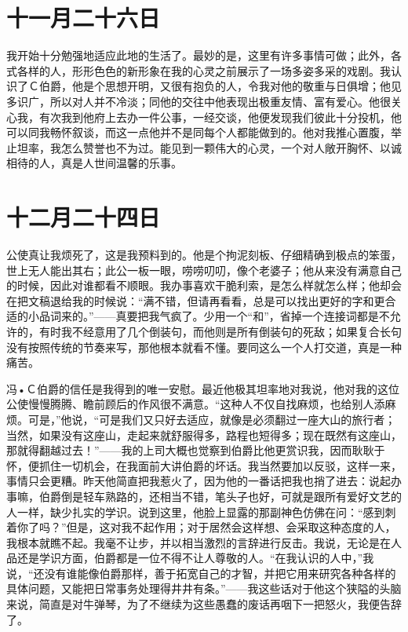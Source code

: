 \documentclass[12pt,oneside]{book}
\begin{document}
\chapter{十一月二十六日}
我开始十分勉强地适应此地的生活了。最妙的是，这里有许多事情可做；此外，各式各样的人，形形色色的新形象在我的心灵之前展示了一场多姿多采的戏剧。我认识了Ｃ伯爵，他是个思想开明，又很有抱负的人，令我对他的敬重与日俱增；他见多识广，所以对人并不冷淡；同他的交往中他表现出极重友情、富有爱心。他很关心我，有次我到他府上去办一件公事，一经交谈，他便发现我们彼此十分投机，他可以同我畅怀叙谈，而这一点他并不是同每个人都能做到的。他对我推心置腹，举止坦率，我怎么赞誉也不为过。能见到一颗伟大的心灵，一个对人敞开胸怀、以诚相待的人，真是人世间温馨的乐事。
　

\chapter{十二月二十四日}
公使真让我烦死了，这是我预料到的。他是个拘泥刻板、仔细精确到极点的笨蛋，世上无人能出其右；此公一板一眼，唠唠叨叨，像个老婆子；他从来没有满意自己的时候，因此对谁都看不顺眼。我办事喜欢干脆利索，是怎么样就怎么样；他却会在把文稿退给我的时候说：“满不错，但请再看看，总是可以找出更好的字和更合适的小品词来的。”——真要把我气疯了。少用一个“和”，省掉一个连接词都是不允许的，有时我不经意用了几个倒装句，而他则是所有倒装句的死敌；如果复合长句没有按照传统的节奏来写，那他根本就看不懂。要同这么一个人打交道，真是一种痛苦。

冯•Ｃ伯爵的信任是我得到的唯一安慰。最近他极其坦率地对我说，他对我的这位公使慢慢腾腾、瞻前顾后的作风很不满意。“这种人不仅自找麻烦，也给别人添麻烦。可是，”他说，“可是我们又只好去适应，就像是必须翻过一座大山的旅行者；当然，如果没有这座山，走起来就舒服得多，路程也短得多；现在既然有这座山，那就得翻越过去！”——我的上司大概也觉察到伯爵比他更赏识我，因而耿耿于怀，便抓住一切机会，在我面前大讲伯爵的坏话。我当然要加以反驳，这样一来，事情只会更糟。昨天他简直把我惹火了，因为他的一番话把我也捎了进去：说起办事嘛，伯爵倒是轻车熟路的，还相当不错，笔头子也好，可就是跟所有爱好文艺的人一样，缺少扎实的学识。说到这里，他脸上显露的那副神色仿佛在问：“感到刺着你了吗？”但是，这对我不起作用；对于居然会这样想、会采取这种态度的人，我根本就瞧不起。我毫不让步，并以相当激烈的言辞进行反击。我说，无论是在人品还是学识方面，伯爵都是一位不得不让人尊敬的人。“在我认识的人中，”我说，“还没有谁能像伯爵那样，善于拓宽自己的才智，并把它用来研究各种各样的具体问题，又能把日常事务处理得井井有条。”——我这些话对于他这个狭隘的头脑来说，简直是对牛弹琴，为了不继续为这些愚蠢的废话再咽下一把怒火，我便告辞了。
\end{document}

